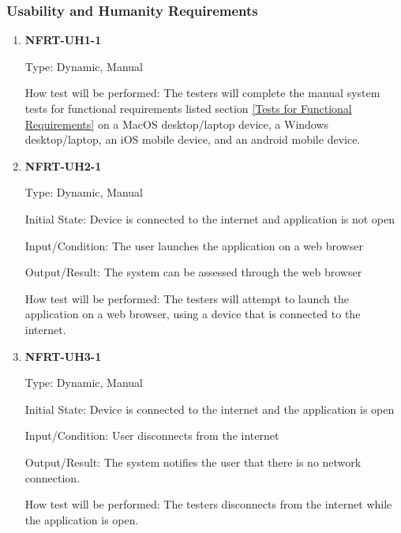 \documentclass[12pt, titlepage]{article}
\begin{document}
\subsubsection{Usability and Humanity Requirements}
\begin{enumerate}

	\item \textbf{NFRT-UH1-1} %

	      Type: Dynamic, Manual

	      How test will be performed: The testers will complete the manual system tests for functional
	      requirements listed section \ref{Tests for Functional Requirements} on a MacOS desktop/laptop
	      device, a Windows desktop/laptop, an iOS mobile device, and an android mobile device.

	\item \textbf{NFRT-UH2-1} %

	      Type: Dynamic, Manual

	      Initial State: Device is connected to the internet and application is not open

	      Input/Condition: The user launches the application on a web browser

	      Output/Result: The system can be assessed through the web browser

	      How test will be performed: The testers will attempt to launch the application on a web browser,
	      using a device that is connected to the internet.

	\item \textbf{NFRT-UH3-1} %

	      Type: Dynamic, Manual

	      Initial State: Device is connected to the internet and the application is open

	      Input/Condition: User disconnects from the internet

	      Output/Result: The system notifies the user that there is no network connection.

	      How test will be performed: The testers disconnects from the internet while the application is
	      open.

\end{enumerate}
\end{document}
